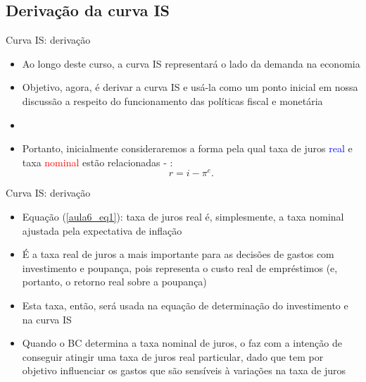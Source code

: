 \documentclass[10pt]{beamer}
\begin{document}
\subsection{Derivação da curva IS}
\begin{frame}{Curva IS: derivação}\label{voltar}
    \begin{itemize}
        \item Ao longo deste curso, a curva IS representará o lado da demanda na economia\bigskip

        \item Objetivo, agora, é derivar a curva IS e usá-la como um ponto inicial em nossa discussão a respeito do funcionamento das políticas fiscal e monetária\bigskip

        \item {}\bigskip

        \item Portanto, inicialmente consideraremos a forma pela qual taxa de juros \textcolor{blue}{real} e taxa \textcolor{red}{nominal} estão relacionadas - \hyperlink{ap1}{}:
        \begin{equation}
            r = i - \pi^e.
            \label{aula6_eq1}
        \end{equation}
    \end{itemize}
\end{frame}

\begin{frame}{Curva IS: derivação}
    \begin{itemize}
        \item Equação (\ref{aula6_eq1}): taxa de juros real é, simplesmente, a taxa nominal ajustada pela expectativa de inflação\bigskip

        \item É a taxa real de juros a mais importante para as decisões de gastos com investimento e poupança, pois representa o custo real de empréstimos (e, portanto, o retorno real sobre a poupança)\bigskip

        \item Esta taxa, então, será usada na equação de determinação do investimento e na curva IS\bigskip

        \item Quando o BC determina a taxa nominal de juros, o faz com a intenção de conseguir atingir uma taxa de juros real particular, dado que tem por objetivo influenciar os gastos que são sensíveis à variações na taxa de juros
    \end{itemize}
\end{frame}
\end{document}
